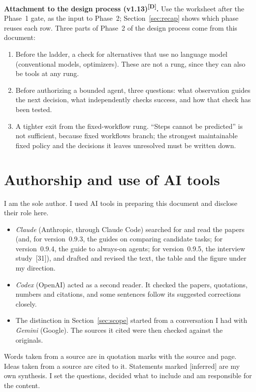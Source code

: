 \documentclass[10pt]{article}
\newcommand{\inferred}{\textsf{\small[inferred]}}
\newcommand{\p}[1]{\textsuperscript{[#1]}}
\begin{document}
\textbf{Attachment to the design process (v1.13)\p{D}.}
Use the worksheet after the Phase~1 gate, as the input to Phase~2; Section~\ref{sec:recap} shows which phase reuses each row.
Three parts of Phase~2 of the design process come from this document:
\begin{enumerate}
\item Before the ladder, a check for alternatives that use no language model (conventional models, optimizers). These are not a rung, since they can also be tools at any rung.
\item Before authorizing a bounded agent, three questions: what observation guides the next decision, what independently checks success, and how that check has been tested.
\item A tighter exit from the fixed-workflow rung. ``Steps cannot be predicted'' is not sufficient, because fixed workflows branch; the strongest maintainable fixed policy and the decisions it leaves unresolved must be written down.
\end{enumerate}

\section*{Authorship and use of AI tools}

I am the sole author. I used AI tools in preparing this document and disclose their role here.
\begin{itemize}
\item \emph{Claude} (Anthropic, through Claude Code) searched for and read the papers (and, for version~0.9.3, the guides on comparing candidate tasks; for version~0.9.4, the guide to always-on agents; for version~0.9.5, the interview study~[31]), and drafted and revised the text, the table and the figure under my direction.
\item \emph{Codex} (OpenAI) acted as a second reader. It checked the papers, quotations, numbers and citations, and some sentences follow its suggested corrections closely.
\item The distinction in Section~\ref{sec:scope} started from a conversation I had with \emph{Gemini} (Google). The sources it cited were then checked against the originals.
\end{itemize}
Words taken from a source are in quotation marks with the source and page. Ideas taken from a source are cited to it. Statements marked \inferred{} are my own synthesis.
I set the questions, decided what to include and am responsible for the content.
\end{document}
